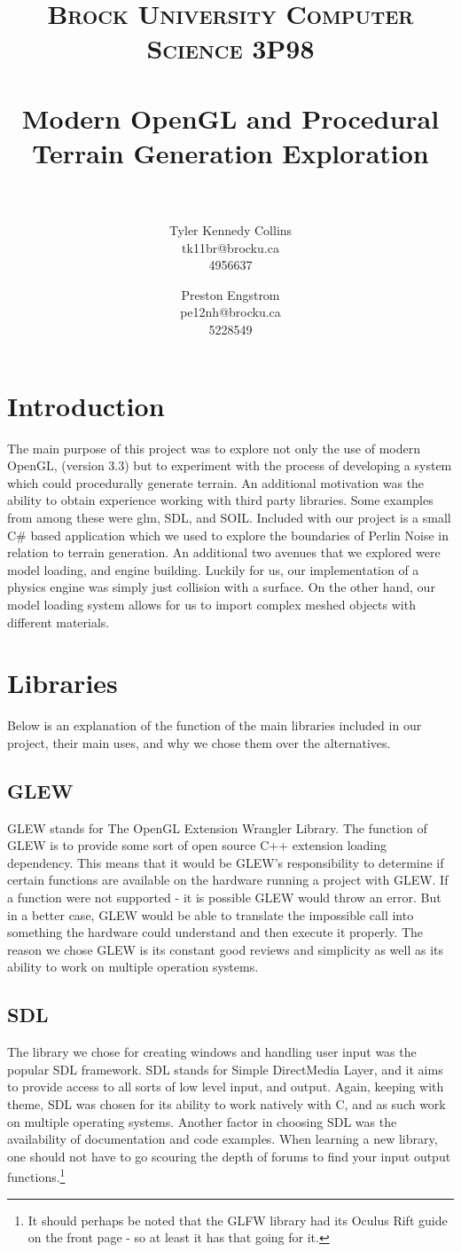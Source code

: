 \documentclass[paper=a4, fontsize=11pt]{scrartcl}
\title{
		\usefont{OT1}{bch}{b}{n}
		\normalfont \normalsize \textsc{Brock University Computer Science 3P98} \\ [25pt]
		\horrule{0.5pt} \\[0.4cm]
		\huge Modern OpenGL and Procedural Terrain Generation Exploration \\
		\horrule{2pt} \\[0.5cm]
}
\author{
		\normalfont 								\normalsize
        Tyler Kennedy Collins\\[-3pt]				\normalsize
        tk11br@brocku.ca\\[-3pt]					\normalsize
        4956637\\									\normalsize
        \and
        Preston Engstrom\\[-3pt]					\normalsize
        pe12nh@brocku.ca\\[-3pt]					\normalsize
        5228549\\									\normalsize
}
\date{}
\numberwithin{equation}{section}		%
\numberwithin{figure}{section}			%
\numberwithin{table}{section}				%
\begin{document}
\maketitle
\section{Introduction}
The main purpose of this project was to explore not only the use of modern OpenGL, (version 3.3) but to experiment with the process of developing a system which could procedurally generate terrain. An additional motivation was the ability to obtain experience working with third party libraries. Some examples from among these were glm, SDL, and SOIL. Included with our project is a small C\# based application which we used to explore the boundaries of Perlin Noise in relation to terrain generation. An additional two avenues that we explored were model loading, and engine building. Luckily for us, our implementation of a physics engine was simply just collision with a surface. On the other hand, our model loading system allows for us to import complex meshed objects with different materials.

\section{Libraries}
Below is an explanation of the function of the main libraries included in our project, their main uses, and why we chose them over the alternatives.
\subsection{GLEW}
GLEW stands for The OpenGL Extension Wrangler Library. The function of GLEW is to provide some sort of open source C++ extension loading dependency. This means that it would be GLEW's responsibility to determine if certain functions are available on the hardware running a project with GLEW. If a function were not supported - it is possible GLEW would throw an error. But in a better case, GLEW would be able to translate the impossible call into something the hardware could understand and then execute it properly. The reason we chose GLEW is its constant good reviews and simplicity as well as its ability to work on multiple operation systems.
\subsection{SDL}
The library we chose for creating windows and handling user input was the popular SDL framework. SDL stands for Simple DirectMedia Layer, and it aims to provide access to all sorts of low level input, and output. Again, keeping with theme, SDL was chosen for its ability to work natively with C, and as such work on multiple operating systems. Another factor in choosing SDL was the availability of documentation and code examples. When learning a new library, one should not have to go scouring the depth of forums to find your input output functions.\footnote{It should perhaps be noted that the GLFW library had its Oculus Rift guide on the front page - so at least it has that going for it.}
\end{document}
